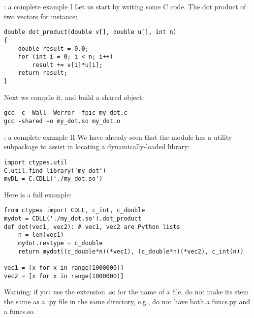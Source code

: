 \documentclass[10pt, t]{beamer}
\let\texttt=\graytt
\begin{document}
\begin{frame}[fragile,label=sec-3-6]{\texttt{ctypes}: a complete example I}
Let us start by writing some C code. The dot product of two vectors for instance:
\lstset{language=C,label= ,caption= ,numbers=none}
\begin{lstlisting}
double dot_product(double v[], double u[], int n)
{
    double result = 0.0;
    for (int i = 0; i < n; i++)
        result += v[i]*u[i];
    return result;
}
\end{lstlisting}
\pause
Next we compile it, and build a shared object:
\lstset{language=C,label= ,caption= ,numbers=none}
\begin{lstlisting}
gcc -c -Wall -Werror -fpic my_dot.c 
gcc -shared -o my_dot.so my_dot.o
\end{lstlisting}
\end{frame}

\begin{frame}[fragile,label=sec-3-7]{\texttt{ctypes}: a complete example II}
We have already seen that the \texttt{ctypes} module has a utility subpackage to assist in locating a dynamically-loaded library:
\lstset{language=C,label= ,caption= ,numbers=none}
\begin{lstlisting}
import ctypes.util
C.util.find_library('my_dot')
myDL = C.CDLL('./my_dot.so')
\end{lstlisting}
\pause
Here is a full example:
\lstset{language=C,label= ,caption= ,numbers=none}
\begin{lstlisting}
from ctypes import CDLL, c_int, c_double
mydot = CDLL('./my_dot.so').dot_product
def dot(vec1, vec2): # vec1, vec2 are Python lists
    n = len(vec1)
    mydot.restype = c_double
    return mydot((c_double*n)(*vec1), (c_double*n)(*vec2), c_int(n))

vec1 = [x for x in range(1000000)]
vec2 = [x for x in range(1000000)]
\end{lstlisting}
\pause
Warning: if you use the extension .so for the name of a file, do not make its stem the same as a .py file in the same directory, e.g., do not have both a funcs.py and a funcs.so.
\end{frame}


\end{document}
